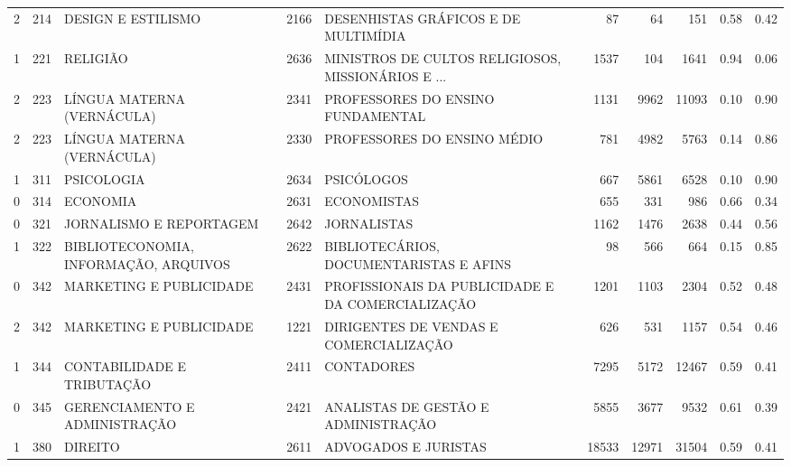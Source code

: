 \begin{table}
\begin{tabular}{rrlrlrrrrr}
       2 &    214 &                                 DESIGN E ESTILISMO & 2166 &               DESENHISTAS GRÁFICOS E DE MULTIMÍDIA &    87 &    64 &    151 & 0.58 & 0.42 \\
       1 &    221 &                                           RELIGIÃO & 2636 & MINISTROS DE CULTOS RELIGIOSOS, MISSIONÁRIOS E ... &  1537 &   104 &   1641 & 0.94 & 0.06 \\
       2 &    223 &                         LÍNGUA MATERNA (VERNÁCULA) & 2341 &                  PROFESSORES DO ENSINO FUNDAMENTAL &  1131 &  9962 &  11093 & 0.10 & 0.90 \\
       2 &    223 &                         LÍNGUA MATERNA (VERNÁCULA) & 2330 &                        PROFESSORES DO ENSINO MÉDIO &   781 &  4982 &   5763 & 0.14 & 0.86 \\
       1 &    311 &                                         PSICOLOGIA & 2634 &                                         PSICÓLOGOS &   667 &  5861 &   6528 & 0.10 & 0.90 \\
       0 &    314 &                                           ECONOMIA & 2631 &                                        ECONOMISTAS &   655 &   331 &    986 & 0.66 & 0.34 \\
       0 &    321 &                            JORNALISMO E REPORTAGEM & 2642 &                                        JORNALISTAS &  1162 &  1476 &   2638 & 0.44 & 0.56 \\
       1 &    322 &              BIBLIOTECONOMIA, INFORMAÇÃO, ARQUIVOS & 2622 &            BIBLIOTECÁRIOS, DOCUMENTARISTAS E AFINS &    98 &   566 &    664 & 0.15 & 0.85 \\
       0 &    342 &                            MARKETING E PUBLICIDADE & 2431 &  PROFISSIONAIS DA PUBLICIDADE E DA COMERCIALIZAÇÃO &  1201 &  1103 &   2304 & 0.52 & 0.48 \\
       2 &    342 &                            MARKETING E PUBLICIDADE & 1221 &           DIRIGENTES DE VENDAS E  COMERCIALIZAÇÃO  &   626 &   531 &   1157 & 0.54 & 0.46 \\
       1 &    344 &                         CONTABILIDADE E TRIBUTAÇÃO & 2411 &                                         CONTADORES &  7295 &  5172 &  12467 & 0.59 & 0.41 \\
       0 &    345 &                      GERENCIAMENTO E ADMINISTRAÇÃO & 2421 &                ANALISTAS DE GESTÃO E ADMINISTRAÇÃO &  5855 &  3677 &   9532 & 0.61 & 0.39 \\
       1 &    380 &                                            DIREITO & 2611 &                               ADVOGADOS E JURISTAS & 18533 & 12971 &  31504 & 0.59 & 0.41 \\

\end{tabular}
\end{table}
